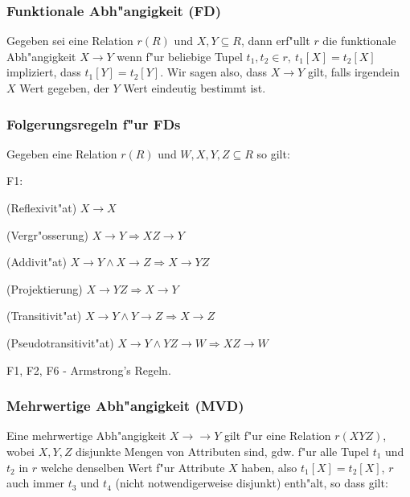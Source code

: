 \documentclass[german, 10pt, a4paper, twocolumn]{scrartcl}
\theoremstyle{definition}
\theoremstyle{remark}
\theoremstyle{example}
\begin{document}
\subsubsection{Funktionale Abh"angigkeit (FD)}

Gegeben sei eine Relation $r(R)$ und $X, Y \subseteq R$, dann erf"ullt $r$ die funktionale Abh"angigkeit $X\rightarrow Y$ wenn f"ur beliebige Tupel $t_1,t_2 \in r,\ t_1[X] = t_2[X]$ impliziert, dass $t_1[Y] = t_2[Y]$.
Wir sagen also, dass $X \rightarrow Y$ gilt, falls irgendein $X$ Wert gegeben, der $Y$ Wert eindeutig bestimmt ist.


\subsubsection{Folgerungsregeln f"ur FDs}

Gegeben eine Relation $r(R)$ und $W,X,Y,Z \subseteq R$ so gilt:

\begin{labeling}{ F1:}
	\item[\usekomafont{descriptionlabel} F1:] (Reflexivit"at) $X \rightarrow X$
	\item[\usekomafont{descriptionlabel} F2:] (Vergr"osserung) $X \rightarrow Y \Rightarrow XZ \rightarrow Y$
	\item[\usekomafont{descriptionlabel} F3:] (Addivit"at) $X \rightarrow Y \land X \rightarrow Z \Rightarrow X \rightarrow YZ$
	\item[\usekomafont{descriptionlabel} F4:] (Projektierung) $X \rightarrow YZ \Rightarrow X \rightarrow Y$
	\item[\usekomafont{descriptionlabel} F5:] (Transitivit"at) $X \rightarrow Y \land Y \rightarrow Z \Rightarrow X \rightarrow Z$
	\item[\usekomafont{descriptionlabel} F6:] (Pseudotransitivit"at) $X \rightarrow Y \land YZ \rightarrow W \Rightarrow XZ \rightarrow W$
\end{labeling}

F1, F2, F6 - Armstrong's Regeln.


\subsubsection{Mehrwertige Abh"angigkeit (MVD)}

Eine mehrwertige Abh"angigkeit $X\rightarrow\rightarrow Y$ gilt f"ur eine Relation $r(XYZ)$, wobei $X,Y,Z$ disjunkte Mengen von Attributen sind, gdw. f"ur alle Tupel $t_1$ und $t_2$ in $r$ welche denselben Wert f"ur Attribute $X$ haben, also $t_1[X] = t_2[X]$, $r$ auch immer $t_3$ und $t_4$ (nicht notwendigerweise disjunkt) enth"alt, so dass gilt:
\end{document}
